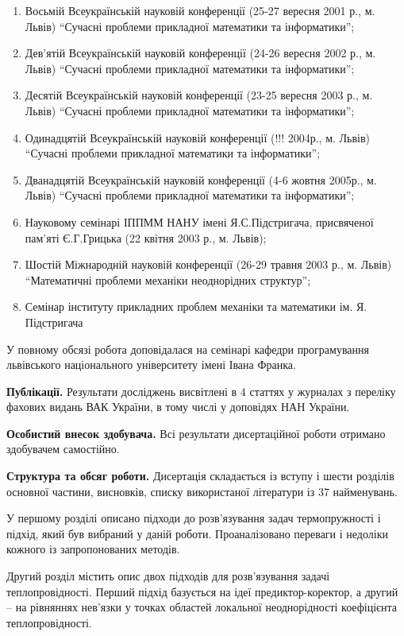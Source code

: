 \begin{enumerate}
\def\labelenumi{\arabic{enumi}.}
\item
  Восьмій Всеукраїнській науковій конференції (25-27 вересня 2001 р., м.
  Львів) ``Сучасні проблеми прикладної математики та інформатики'';
\item
  Дев'ятій Всеукраїнській науковій конференції (24-26 вересня 2002 р.,
  м. Львів) ``Сучасні проблеми прикладної математики та інформатики'';
\item
  Десятій Всеукраїнській науковій конференції (23-25 вересня 2003 р., м.
  Львів) ``Сучасні проблеми прикладної математики та інформатики'';
\item
  Одинадцятій Всеукраїнській науковій конференції (!!! 2004р., м. Львів)
  ``Сучасні проблеми прикладної математики та інформатики'';
\item
  Дванадцятій Всеукраїнській науковій конференції (4-6 жовтня 2005р., м.
  Львів) ``Сучасні проблеми прикладної математики та інформатики'';
\item
  Науковому семінарі ІППММ НАНУ імені Я.С.Підстригача, присвяченої
  пам'яті Є.Г.Грицька (22 квітня 2003 р., м. Львів);
\item
  Шостій Міжнародній науковій конференції (26-29 травня 2003 р., м.
  Львів) ``Математичні проблеми механіки неоднорідних структур'';
\item
  Семінар інституту прикладних проблем механіки та математики ім. Я.
  Підстригача
\end{enumerate}

У повному обсязі робота доповідалася на семінарі кафедри програмування
львівського національного університету імені Івана Франка.

\textbf{Публікації.} Результати досліджень висвітлені в 4 статтях
у журналах з переліку фахових видань ВАК України, в тому числі у
доповідях НАН України.

\textbf{Особистий внесок здобувача.} Всі результати дисертаційної
роботи отримано здобувачем самостійно.

\textbf{Структура та обсяг роботи.} Дисертація складається із
вступу і шести розділів основної частини, висновків, списку використаної
літератури із 37 найменувань.

У першому розділі описано підходи до розв'язування задач термопружності
і підхід, який був вибраний у даній роботи. Проаналізовано переваги і
недоліки кожного із запропонованих методів.

Другий розділ містить опис двох підходів для розв'язування задачі
теплопровідності. Перший підхід базується на ідеї предиктор-коректор, а
другий -- на рівняннях нев'язки у точках областей локальної
неоднорідності коефіцієнта теплопровідності.


